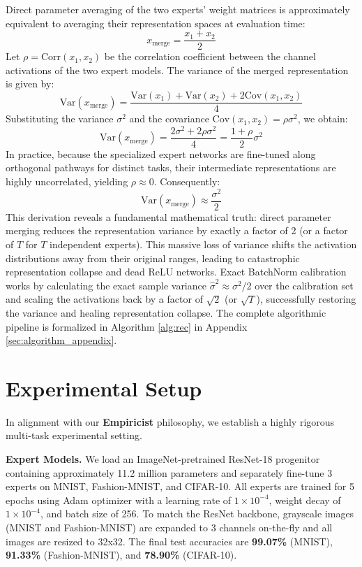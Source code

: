 \documentclass{article}
\theoremstyle{plain}
\theoremstyle{definition}
\theoremstyle{remark}
\begin{document}
Direct parameter averaging of the two experts' weight matrices is approximately equivalent to averaging their representation spaces at evaluation time:
\begin{equation}
    x_{\text{merge}} = \frac{x_1 + x_2}{2}
\end{equation}
Let $\rho = \text{Corr}(x_1, x_2)$ be the correlation coefficient between the channel activations of the two expert models. The variance of the merged representation is given by:
\begin{equation}
    \text{Var}(x_{\text{merge}}) = \frac{\text{Var}(x_1) + \text{Var}(x_2) + 2\text{Cov}(x_1, x_2)}{4}
\end{equation}
Substituting the variance $\sigma^2$ and the covariance $\text{Cov}(x_1, x_2) = \rho \sigma^2$, we obtain:
\begin{equation}
    \text{Var}(x_{\text{merge}}) = \frac{2\sigma^2 + 2\rho\sigma^2}{4} = \frac{1 + \rho}{2} \sigma^2
\end{equation}
In practice, because the specialized expert networks are fine-tuned along orthogonal pathways for distinct tasks, their intermediate representations are highly uncorrelated, yielding $\rho \approx 0$. Consequently:
\begin{equation}
    \text{Var}(x_{\text{merge}}) \approx \frac{\sigma^2}{2}
\end{equation}
This derivation reveals a fundamental mathematical truth: direct parameter merging reduces the representation variance by exactly a factor of 2 (or a factor of $T$ for $T$ independent experts). This massive loss of variance shifts the activation distributions away from their original ranges, leading to catastrophic representation collapse and dead ReLU networks. Exact BatchNorm calibration works by calculating the exact sample variance $\hat{\sigma}^2 \approx \sigma^2/2$ over the calibration set and scaling the activations back by a factor of $\sqrt{2}$ (or $\sqrt{T}$), successfully restoring the variance and healing representation collapse. The complete algorithmic pipeline is formalized in Algorithm \ref{alg:rec} in Appendix \ref{sec:algorithm_appendix}.

\section{Experimental Setup}
\label{sec:setup}
In alignment with our \textbf{Empiricist} philosophy, we establish a highly rigorous multi-task experimental setting.

\textbf{Expert Models.} We load an ImageNet-pretrained ResNet-18 progenitor containing approximately 11.2 million parameters and separately fine-tune 3 experts on MNIST, Fashion-MNIST, and CIFAR-10. All experts are trained for 5 epochs using Adam optimizer with a learning rate of $1 \times 10^{-4}$, weight decay of $1 \times 10^{-4}$, and batch size of 256. To match the ResNet backbone, grayscale images (MNIST and Fashion-MNIST) are expanded to 3 channels on-the-fly and all images are resized to 32x32. The final test accuracies are \textbf{99.07\%} (MNIST), \textbf{91.33\%} (Fashion-MNIST), and \textbf{78.90\%} (CIFAR-10).
\end{document}
